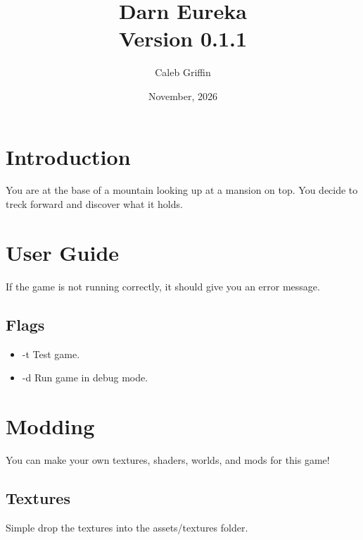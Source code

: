 \documentclass[12pt, letterpaper]{article}
\title{Darn Eureka\\[0.12in] \large Version 0.1.1}
\author{Caleb Griffin}
\date{November, 2026}
\begin{document}
\maketitle
\thispagestyle{empty}

\pagebreak
\tableofcontents
\pagebreak

\section{Introduction}
You are at the base of a mountain looking up at a mansion on top.
You decide to treck forward and discover what it holds.

\section{User Guide}
If the game is not running correctly, it should give you an error message.

\subsection{Flags}
\begin{itemize}
\item -t Test game.
\item -d Run game in debug mode.
\end{itemize}


\section{Modding}
You can make your own textures, shaders, worlds, and mods for this game!

\subsection{Textures}
Simple drop the textures into the assets/textures folder.
\end{document}

